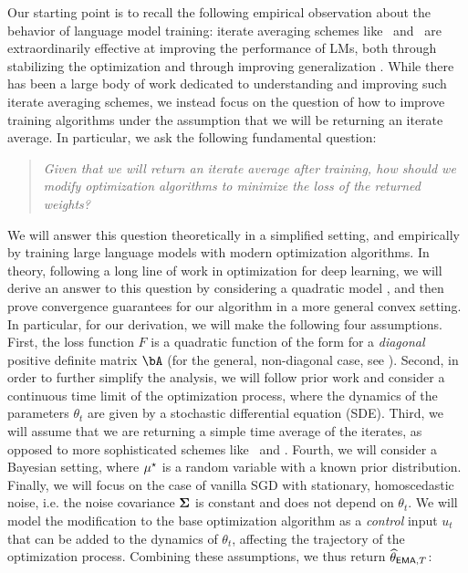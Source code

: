 Our starting point is to recall the following empirical observation about the behavior of language model training: iterate averaging schemes like \ema\ and \bema\ are extraordinarily effective at improving the performance of LMs, both through stabilizing the optimization and through improving generalization \citep{izmailov2018averaging,kaddour2022stop,olmo20242}. While there has been a large body of work dedicated to understanding and improving such iterate averaging schemes, we instead focus on the question of how to improve training algorithms under the assumption that we will be returning an iterate average.  In particular, we ask the following fundamental question:
\begin{quotation}
    \emph{Given that we will return an iterate average after training, how should we modify optimization algorithms to minimize the loss of the returned weights?}
\end{quotation} 
We will answer this question theoretically in a simplified setting, and empirically by training large language models with modern optimization algorithms.  In theory, following a long line of work in optimization for deep learning, we will derive an answer to this question by considering a quadratic model \citep{duchi2011adaptive,gupta2018shampoo,zhang2019lookahead,block2025ema,block2024butterfly,busbridge2023scale}, and then prove convergence guarantees for our algorithm in a more general convex setting.  In particular, for our derivation, we will make the following four assumptions. First, the loss function $F$ is a quadratic function of the form \iftoggle{colt}{$F(\theta) = \nicefrac 12 \left( \theta - \mustar \right)^\top \bA \left( \theta - \mustar \right)$}{
    \begin{align}
        F(\theta) = \frac{1}{2} \left( \theta - \mustar \right)^\top \bA \left( \theta - \mustar \right),
    \end{align}
}
for a \emph{diagonal} positive definite matrix $\bA$ (for the general, non-diagonal case, see ).  Second, in order to further simplify the analysis, we will follow prior work \citep{block2025ema,block2024butterfly,malladi2022sdes,mandt2015continuous,block2020generative} and consider a continuous time limit of the optimization process, where the dynamics of the parameters $\theta_t$ are given by a stochastic differential equation (SDE).  Third, we will assume that we are returning a simple time average of the iterates, as opposed to more sophisticated schemes like \ema\ and \bema. Fourth, we will consider a Bayesian setting, where $\mustar$ is a random variable with a known prior distribution.  Finally, we will focus on the case of vanilla SGD with stationary, homoscedastic noise, i.e. the noise covariance $\bSigma$ is constant and does not depend on $\theta_t$.  We will model the modification to the base optimization algorithm as a \emph{control} input $u_t$ that can be added to the dynamics of $\theta_t$, affecting the trajectory of the optimization process.  Combining these assumptions, we thus return $\thetema[T]$:
